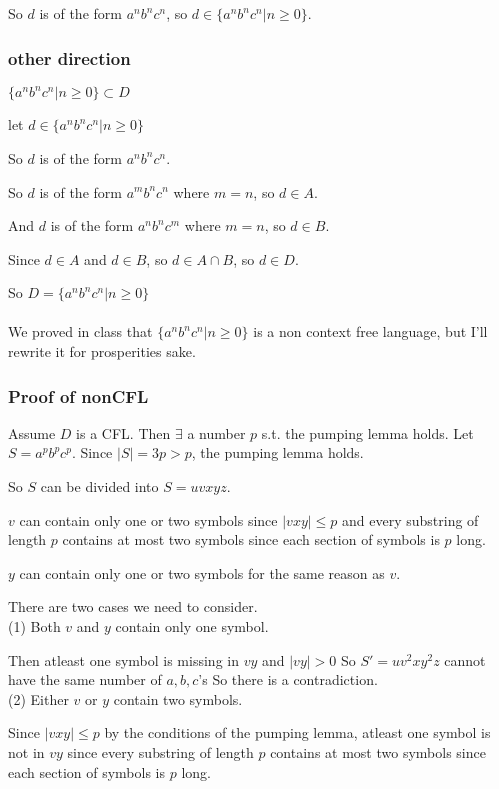 \documentclass[letterpaper, 11pt]{article}
\begin{document}
So $d$ is of the form $a^nb^nc^n$, so $d \in \{a^nb^nc^n | n \geq 0\}$.
\subsubsection*{other direction}
$\{a^nb^nc^n | n \geq 0\} \subset D$

let $d \in \{a^nb^nc^n | n \geq 0\}$

So $d$ is of the form $a^nb^nc^n$.

So $d$ is of the form $a^mb^nc^n$ where $m = n$, so $d \in A$.

And $d$ is of the form $a^nb^nc^m$ where $m = n$, so $d \in B$.

Since $d \in A$ and $d \in B$, so $d \in A \cap B$, so $d \in D$.

So $D = \{a^nb^nc^n | n \geq 0\}$\\\\
We proved in class that $\{a^nb^nc^n | n \geq 0\}$ is a non context free language, but I'll rewrite it for prosperities sake.

\subsubsection*{Proof of nonCFL}
Assume $D$ is a CFL. Then $\exists$ a number $p$ s.t. the pumping lemma holds.
Let $S = a^pb^pc^p$.
Since $|S| = 3p > p$, the pumping lemma holds.

So $S$ can be divided into $S = uvxyz$.

$v$ can contain only one or two symbols since $|vxy| \leq p$ and every substring of length $p$ contains at most two symbols since each section of symbols is $p$ long.

$y$ can contain only one or two symbols for the same reason as $v$.

There are two cases we need to consider.\\

(1) Both $v$ and $y$ contain only one symbol.

Then atleast one symbol is missing in $vy$ and $|vy| > 0$
So $S' = uv^2xy^2z$ cannot have the same number of $a,b,c$'s
So there is a contradiction.\\

(2) Either $v$ or $y$ contain two symbols.

Since $|vxy| \leq p$ by the conditions of the pumping lemma, atleast one symbol is not in $vy$ since every substring of length $p$ contains at most two symbols since each section of symbols is $p$ long.
\end{document}
